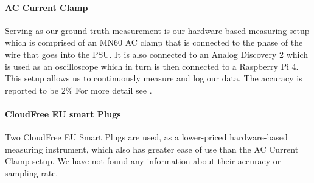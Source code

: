 \paragraph{AC Current Clamp}
Serving as our ground truth measurement is our hardware-based measuring setup which is comprised of an MN60 AC clamp that is connected to the phase of the wire that goes into the PSU. It is also connected to an Analog Discovery 2 which is used as an oscilloscope which in turn is then connected to a Raspberry Pi 4. This setup allows us to continuously measure and log our data. The accuracy is reported to be $2\%$ For more detail see \cite{biksbois}.

\paragraph{CloudFree EU smart Plugs}
Two CloudFree EU Smart Plugs\cite{CloudFreeEUSMartPlug} are used, as a lower-priced hardware-based measuring instrument, which also has greater ease of use than the AC Current Clamp setup. We have not found any information about their accuracy or sampling rate.